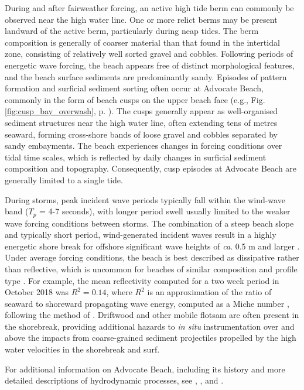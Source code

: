 During and after fairweather forcing, an active high tide berm can commonly be observed near the high water line. One or more relict berms may be present landward of the active berm, particularly during neap tides. The berm composition is generally of coarser material than that found in the intertidal zone, consisting of relatively well sorted gravel and cobbles. Following periods of energetic wave forcing, the beach appears free of distinct morphological features, and the beach surface sediments are predominantly sandy. Episodes of pattern formation and surficial sediment sorting often occur at Advocate Beach, commonly in the form of beach cusps on the upper beach face (e.g., Fig. \ref{fig:cusp_bay_overwash}, p. \pageref{fig:cusp_bay_overwash}). The cusps generally appear as well-organised sediment structures near the high water line, often extending tens of metres seaward, forming cross-shore bands of loose gravel and cobbles separated by sandy embayments. The beach experiences changes in forcing conditions over tidal time scales, which is reflected by daily changes in surficial sediment composition and topography. Consequently, cusp episodes at Advocate Beach are generally limited to a single tide.

During storms, peak incident wave periods typically fall within the wind-wave band ($T_p$ = 4-7 seconds), with longer period swell usually limited to the weaker wave forcing conditions between storms. The combination of a steep beach slope and typically short period, wind-generated incident waves result in a highly energetic shore break for offshore significant wave heights of \textit{ca}. 0.5 m and larger \citep{Hay_etal2014}. Under average forcing conditions, the beach is best described as dissipative rather than reflective, which is uncommon for beaches of similar composition and profile type \citep[e.g.,][]{Wright_etal1979}. For example, the mean reflectivity computed for a two week period in October 2018 was $R^2=0.14$, where $R^2$ is an approximation of the ratio of seaward to shoreward propagating wave energy, computed as a Miche number \citep{Miche1951}, following the method of \citet{Elgar_etal1994}. Driftwood and other mobile flotsam are often present in the shorebreak, providing additional hazards to \textit{in situ} instrumentation over and above the impacts from coarse-grained sediment projectiles propelled by the high water velocities in the shorebreak and surf.

For additional information on Advocate Beach, including its history and more detailed descriptions of hydrodynamic processes, see \citet{Taylor_etal1985}, \citet{Wilson_etal2014}, and \citet{Hay_etal2014}.



